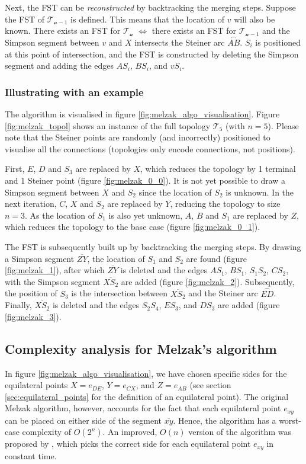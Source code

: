 \documentclass{l4proj}
\newcommand{\arc}[1]{\stackrel{\frown}{#1}}
\begin{document}
Next, the FST can be \textit{reconstructed} by backtracking the merging steps.
Suppose the FST of $\mathcal{T_{n-1}}$ is defined. This means that the location of $v$ will also be known.
There exists an FST for $\mathcal{T_n}$ $\iff$ there exists an FST for $\mathcal{T_{n-1}}$ and the Simpson segment between $v$ and $X$ intersects the Steiner arc $\arc{AB}$. $S_i$ is positioned at this point of intersection, and the FST is constructed by deleting the Simpson segment and adding the edges $AS_i$, $BS_i$, and $vS_i$.

\subsubsection{Illustrating with an example}
The algorithm is visualised in figure \ref{fig:melzak_algo_visualisation}.
Figure \ref{fig:melzak_topol} shows an instance of the full topology $\mathcal{T_5}$ (with $n = 5$). Please note that the Steiner points are randomly (and incorrectly) positioned to visualise all the connections (topologies only encode connections, not positions).

First, $E$, $D$ and $S_3$ are replaced by $X$, which reduces the topology by 1 terminal and 1 Steiner point (figure \ref{fig:melzak_0_0}). It is not yet possible to draw a Simpson segment between $X$ and $S_2$ since the location of $S_2$ is unknown.
In the next iteration, $C$, $X$ and $S_2$ are replaced by $Y$, reducing the topology to size $n = 3$. As the location of $S_1$ is also yet unknown, $A$, $B$ and $S_1$ are replaced by $Z$, which reduces the topology to the base case (figure \ref{fig:melzak_0_1}).

The FST is subsequently built up by backtracking the merging steps. By drawing a Simpson segment $\overline{ZY}$, the location of $S_1$ and $S_2$ are found (figure \ref{fig:melzak_1}), after which $\overline{ZY}$ is deleted and the edges $AS_1$, $BS_1$, $S_1S_2$, $CS_2$, with the Simpson segment $\overline{XS_2}$ are added (figure \ref{fig:melzak_2}).
Subsequently, the position of $S_3$ is the intersection between $\overline{XS_2}$ and the Steiner arc $\arc{ED}$. Finally, $\overline{XS_2}$ is deleted and the edges $S_2S_4$, $ES_3$, and $DS_3$ are added (figure \ref{fig:melzak_3}).


\subsection{Complexity analysis for Melzak's algorithm}
In figure \ref{fig:melzak_algo_visualisation}, we have chosen specific sides for the equilateral points $X = e_{DE}$, $Y = e_{CX}$, and $Z = e_{AB}$ (see section \ref{sec:equilateral_points} for the definition of an equilateral point).
The original Melzak algorithm, however, accounts for the fact that each equilateral point $e_{xy}$ can be placed on either side of the segment $\overline{xy}$. Hence, the algorithm has a worst-case complexity of $O(2^n)$.
An improved, $O(n)$ version of the algorithm was proposed by \cite{Melzak_linear_time}, which picks the correct side for each equilateral point $e_{xy}$ in constant time.
\end{document}
